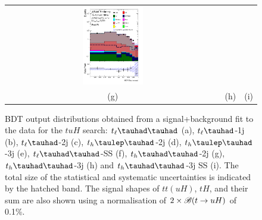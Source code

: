 \documentclass[PAPER, coverpage, atlasdraft=true, texlive=2016, UKenglish]{\ATLASLATEXPATH atlasdoc}
\begin{document}
\begin{figure}[H]
\begin{tabular}{@{}ccc@{}}
\includegraphics[width=0.29\textwidth]{figures/tuH_reg2mtau1b3jss.pdf}\\
(g) & (h)  & (i) \\
\end{tabular}
\caption{ BDT output distributions obtained from a signal+background fit to the data for the $tuH$ search: 
$t_{\ell}\thadhad$ (a), $t_{\ell}\tauhad$-1j (b),  $t_{\ell}\tauhad$-2j (c), $t_h\tlhad$-2j (d), $t_h\tlhad$-3j (e), $t_{\ell}\thadhad$-SS (f), $t_h\thadhad$-2j (g), $t_h\thadhad$-3j (h) and $t_h\thadhad$-3j SS (i).  
The total size of the statistical and systematic uncertainties is indicated by the hatched band. The signal shapes of $tt(uH)$, $tH$, and their sum are also shown using a normalisation of $2 \times\mathscr{B}(t\to uH)$ of 0.1\%. 
}
\label{fig:asimov_postfitbdtHu}
\end{figure}
\end{document}
